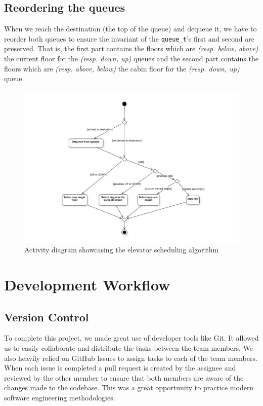 \documentclass[12pt, a4paper]{report}
\begin{document}
\section{Reordering the queues}
When we reach the destination (the top of the queue) and dequeue it, we have to reorder both queues to ensure the invariant of the \texttt{queue\_t}'s first and second are preserved. That is, the first part contains the floors which are \textit{(resp. below, above)} the current floor for the \textit{(resp. down, up)} queues and the second part contains the floors which are \textit{(resp. above, below)} the cabin floor for the \textit{(resp. down, up)} queue.

\begin{figure}[ht]
    \centering
    \includegraphics[width=\textwidth]{assets/scheduler.pdf}
    \caption{Activity diagram showcasing the elevator scheduling algorithm}
\end{figure}

\chapter{Development Workflow}

\section{Version Control}

To complete this project, we made great use of developer tools like Git. It allowed us to easily collaborate and distribute the tasks between the team members. We also heavily relied on GitHub Issues to assign tasks to each of the team members. When each issue is completed a pull request is created by the assignee and reviewed by the other member to ensure that both members are aware of the changes made to the codebase. This was a great opportunity to practice modern software engineering methodologies.
\end{document}
